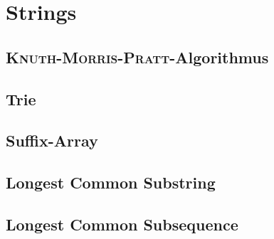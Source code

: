 \section{Strings}

\subsection{\textsc{Knuth-Morris-Pratt}-Algorithmus}


\subsection{Trie}


\subsection{Suffix-Array}


\subsection{Longest Common Substring}


\subsection{Longest Common Subsequence}

